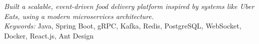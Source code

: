 
\nointent
\textit{Built a scalable, event-driven food delivery platform inspired by systems like Uber Eats, using a modern microservices architecture.} \\

\nointent
\textit{Keywords:} Java, Spring Boot, gRPC, Kafka, Redis, PostgreSQL, WebSocket, Docker, React.js, Ant Design
